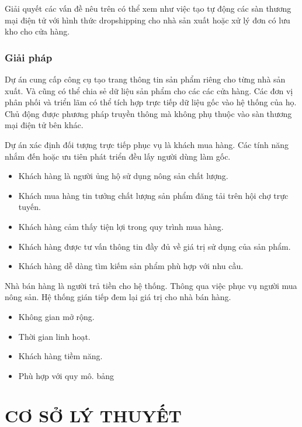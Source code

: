 \documentclass[11pt]{report}
\begin{document}
	Giải quyết các vấn đề nêu trên có thể xem như việc tạo tự động các sàn thương mại điện tử với hình thức dropshipping cho nhà sản xuất hoặc xử lý đơn có lưu kho cho cửa hàng.
	
	
	\subsection*{Giải pháp}
	
	Dự án cung cấp công cụ tạo trang thông tin sản phẩm riêng cho từng nhà sản xuất. Và cũng có thể chia sẻ dữ liệu sản phẩm cho các các cửa hàng. Các đơn vị phân phối và triển lãm có thể tích hợp trực tiếp dữ liệu gốc vào hệ thống của họ. Chủ động được phương pháp truyền thông mà không phụ thuộc vào sàn thương mại điện tử bên khác.
	
	Dự án xác định đối tượng trực tiếp phục vụ là khách mua hàng. Các tính năng nhắm đến hoặc ưu tiên phát triển đều lấy người dùng làm gốc.
	
	\begin{itemize}
		\item Khách hàng là người ủng hộ sử dụng nông sản chất lượng.
		\item Khách mua hàng tin tưởng chất lượng sản phẩm đăng tải trên hội chợ trực tuyến.
		\item Khách hàng cảm thấy tiện lợi trong quy trình mua hàng.
		\item Khách hàng được tư vấn thông tin đầy đủ về giá trị sử dụng của sản phẩm.
		\item Khách hàng dễ dàng tìm kiếm sản phẩm phù hợp với nhu cầu.
	\end{itemize}
	Nhà bán hàng là người trả tiền cho hệ thống. Thông qua việc phục vụ người mua nông sản. Hệ thống gián tiếp đem lại giá
	trị cho nhà bán hàng.
	\begin{itemize}
		\item Không gian mở rộng.
		\item Thời gian linh hoạt.
		\item Khách hàng tiềm năng.
		\item Phù hợp với quy mô.
		bảng
	\end{itemize}
	
	\chapter{CƠ SỞ LÝ THUYẾT}
\end{document}
